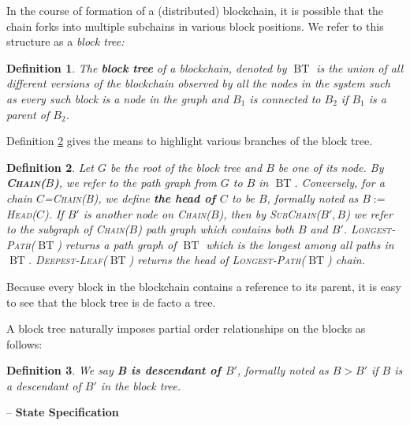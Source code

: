 \documentclass{article}
\newcommand{\assign}{:=}
\newcommand{\chapter}[1]{\medskip\bigskip--\noindent\textbf{\huge #1}}
\newcommand{\tmem}[1]{{\em #1\/}}
\newcommand{\tmname}[1]{\textsc{#1}}
\newcommand{\tmop}[1]{\ensuremath{\operatorname{#1}}}
\newcommand{\tmstrong}[1]{\textbf{#1}}
\newcommand{\tmtextbf}[1]{{\bfseries{#1}}}
\newcommand{\tmtextit}[1]{{\itshape{#1}}}
\newcommand{\tmtextsc}[1]{{\scshape{#1}}}
\newtheorem{definition}{Definition}
\providecommand{\tmem}[1]{\tmtextit{#1}}
\providecommand{\tmname}[1]{\tmtextsc{#1}}
\providecommand{\tmop}[1]{\ensuremath{\mathrm{#1}}}
\providecommand{\tmstrong}[1]{\tmtextbf{#1}}
\providecommand{\tmtextbf}[1]{\tmtextbf{#1}}
\providecommand{\tmtextit}[1]{\tmtextit{#1}}
\newtheorem{definition}{Definition}
\begin{document}
In the course of formation of a (distributed) blockchain, it is possible that
the chain forks into multiple subchains in various block positions. We refer
to this structure as a {\tmem{block tree:}}

\begin{definition}
  \label{defn-block-tree}The {\tmstrong{block tree}} of a blockchain, denoted
  by $\tmop{BT}$ is the union of all different versions of the blockchain
  observed by all the nodes in the system such as every such block is a node
  in the graph and $B_1$ is connected to $B_2$ if $B_1$ is a parent of $B_2$.
\end{definition}

Definition \ref{defn-chain-subchain} gives the means to highlight various
branches of the block tree.

\begin{definition}
  \label{defn-chain-subchain}Let $G$ be the root of the block tree and $B$ be
  one of its node. By {\tmname{{\tmstrong{Chain($B$)}},}} we refer to the path
  graph from $G$ to $B$ in $\tmop{BT}$. Conversely, for a chain
  $C$={\tmname{Chain(B)}}, we define {\tmstrong{the head of $C$}} to be $B$,
  formally noted as $B \assign${\tmname{Head($C$)}}. If $B'$ is another node
  on {\tmname{Chain($B$)}}, then by {\tmname{SubChain($B', B$)}} we refer to
  the subgraph of {\tmname{Chain($B$)}} path graph which contains both $B$ and
  $B'$. {\tmname{Longest-Path($\tmop{BT}$)}} returns a path graph of
  $\tmop{BT}$ which is the longest among all paths in $\tmop{BT}$.
  {\tmname{Deepest-Leaf($\tmop{BT}$)}} returns the head of
  {\tmname{Longest-Path($\tmop{BT}$)}} chain.
\end{definition}

Because every block in the blockchain contains a reference to its parent, it
is easy to see that the block tree is de facto a tree.

A block tree naturally imposes partial order relationships on the blocks as
follows:

\begin{definition}
  We say {\tmstrong{B is descendant of $B'$}}, formally noted as {\tmstrong{$B
  > B'$}} if $B$ is a descendant of $B'$ in the block tree.
\end{definition}

\chapter{ State Specification}\label{chap-state-spec}
\end{document}
